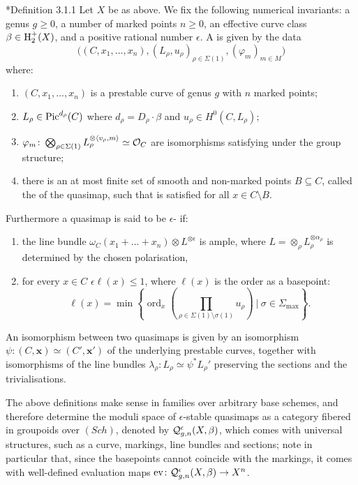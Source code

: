 \begin{definition}\cite{CF-K}*{Definition 3.1.1} Let $X$ be as above. We fix the following numerical invariants: a genus $g \geq 0$, a number of marked points $n \geq 0$, an effective curve class $\beta \in \operatorname{H}_2^+(X)$, and a positive rational number $\epsilon$. A  is given by the data
\begin{equation*} \Big((C,x_1,\ldots,x_n), (L_\rho,u_\rho)_{\rho \in \Sigma(1)}, (\varphi_m)_{m \in M}\Big) \end{equation*}
where:
\begin{enumerate}
\item $(C,x_1,\ldots,x_n)$ is a prestable curve of genus $g$ with $n$ marked points;
\item $L_\rho\in\operatorname{Pic}^{d_\rho}(C)$  where $d_\rho = D_\rho \cdot \beta$ and $u_\rho\in H^0(C,L_\rho)$;
\item $\varphi_m \colon \bigotimes_{\rho \in \Sigma(1)} L_\rho^{\otimes \langle v_\rho, m \rangle} \simeq \mathcal{O}_C$ are isomorphisms satisfying  under the group structure;
\item there is an at most finite set of smooth and non-marked points $B \subseteq C$, called the  of the quasimap, such that  is satisfied for all $x \in C \setminus B$.
\end{enumerate}
Furthermore a quasimap is said to be $\epsilon$- if:
\begin{enumerate}[resume]
 \item the line bundle $ \omega_C(x_1 + \ldots + x_n)\otimes L^{\otimes \epsilon}$ is ample, where $L = \otimes_\rho L_\rho^{\otimes \alpha_\rho}$ is determined by the chosen polarisation,
 \item for every $x\in C$ $\epsilon \ell(x)\leq 1$, where $\ell(x)$ is the order as a basepoint:
\[\ell(x)=\min\left\{\operatorname{ord}_x\left(\prod_{\rho\in\Sigma(1)\setminus \sigma(1)}u_\rho\right)\ |\ \sigma\in\Sigma_{\operatorname{max}}\right\}.\]
\end{enumerate}
An isomorphism between two quasimaps is given by an isomorphism $\psi\colon (C,\mathbf x)\simeq(C',\mathbf x')$ of the underlying prestable curves, together with isomorphisms of the line bundles $\lambda_\rho\colon L_\rho\simeq \psi^* L_\rho'$ preserving the sections and the trivialisations.
\end{definition}

The above definitions make sense in families over arbitrary base schemes, and therefore determine the moduli space of $\epsilon$-stable quasimaps as a category fibered in groupoids over $(Sch)$, denoted by $\mathcal{Q}^{\epsilon}_{g,n}(X,\beta)$, which comes with universal structures, such as a curve, markings, line bundles and sections; note in particular that, since the basepoints cannot coincide with the markings, it comes with well-defined evaluation maps $\operatorname{ev}\colon \mathcal{Q}^{\epsilon}_{g,n}(X,\beta)\rightarrow X^n$.

